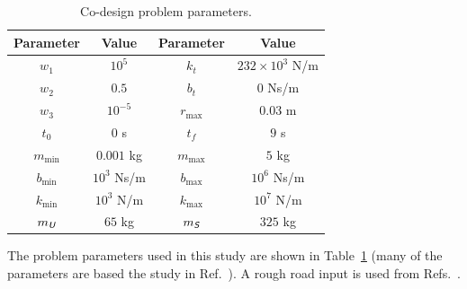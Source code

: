 \begin{table}
\centering
\begin{tabular}{cc|cc}
\hline \hline
Parameter & Value & Parameter & Value \\
\hline
$w_1$ & $10^5$ & $k_t$ & $232\times 10^3$ N/m \\
$w_2$ & $0.5$ & $b_t$ & $0$ Ns/m \\
$w_3$ & $10^{-5}$ & $r_{\max}$ & $0.03$ m \\
$t_0$ & $0$ s & $t_f$ & $9$ s \\
$m_{\min}$ & $0.001$ kg & $m_{\max}$ & $5$ kg  \\
$b_{\min}$ & $10^3$ Ns/m & $b_{\max}$ & $10^6$ Ns/m \\
$k_{\min}$ & $10^3$ N/m & $k_{\max}$ & $10^7$ N/m \\
$m_{\textsl{\textsf{U}}}$ & $65$ kg & $m_{\textsl{\textsf{S}}}$ & $325$ kg \\
\hline \hline
\end{tabular}
\caption{Co-design problem parameters.\label{tb:ch8:parameters}}
\end{table}

The problem parameters used in this study are shown in Table~\ref{tb:ch8:parameters} (many of the parameters are based the study in Ref.~\cite{Allison2014b}).
A rough road input is used from Refs.~\cite{Allison2008b, Allison2014b}.